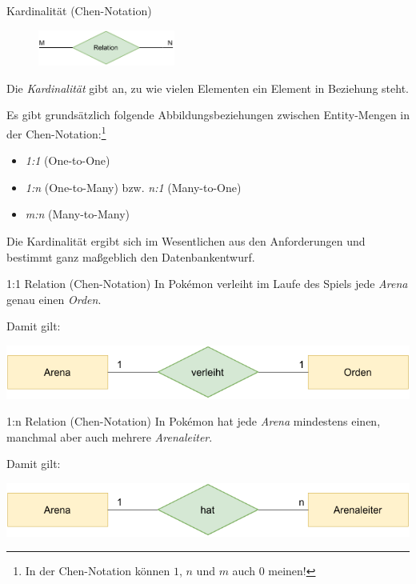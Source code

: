\begin{defi}{Kardinalität (Chen-Notation)}
    \begin{figure}
        \begin{center}
            \includegraphics[width=0.4\textwidth]{includes/figures/definition_entity_relationship_model_cardinality.pdf}
        \end{center}
    \end{figure}
    Die \emph{Kardinalität} gibt an, zu wie vielen Elementen ein Element in Beziehung steht.

    Es gibt grundsätzlich folgende Abbildungsbeziehungen zwischen Entity-Mengen in der Chen-Notation:\footnote{In der Chen-Notation können $1$, $n$ und $m$ auch $0$ meinen!}
    \begin{itemize}
        \item \emph{1:1} (One-to-One)
        \item \emph{1:n} (One-to-Many) bzw. \emph{n:1} (Many-to-One)
        \item \emph{m:n} (Many-to-Many)
    \end{itemize}

    Die Kardinalität ergibt sich im Wesentlichen aus den Anforderungen und bestimmt ganz maßgeblich den Datenbankentwurf.
\end{defi}

\begin{example}{1:1 Relation (Chen-Notation)}
    In Pokémon verleiht im Laufe des Spiels jede \emph{Arena} genau einen \emph{Orden}.

    Damit gilt:
    \begin{center}
        \includegraphics[width=0.7\linewidth]{includes/figures/example_entity_relationship_modell_chen_one_to_one.pdf}
    \end{center}
\end{example}

\begin{example}{1:n Relation (Chen-Notation)}
    In Pokémon hat jede \emph{Arena} mindestens einen, manchmal aber auch mehrere \emph{Arenaleiter}.

    Damit gilt:
    \begin{center}
        \includegraphics[width=0.7\linewidth]{includes/figures/example_entity_relationship_modell_chen_one_to_many.pdf}
    \end{center}
\end{example}

